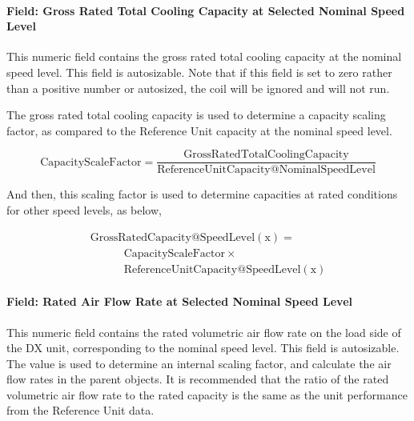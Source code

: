 \paragraph{Field: Gross Rated Total Cooling Capacity at Selected Nominal Speed Level}\label{field-gross-rated-total-cooling-capacity-at-selected-nominal-speed-level}

This numeric field contains the gross rated total cooling capacity at the nominal speed level. This field is autosizable. Note that if this field is set to zero rather than a positive number or autosized, the coil will be ignored and will not run.

The gross rated total cooling capacity is used to determine a capacity scaling factor, as compared to the Reference Unit capacity at the nominal speed level.

\begin{equation}
{\mathrm{CapacityScaleFactor}} = \frac{{{\mathrm{Gross RatedTotalCoolingCapacity}}}}{{{\mathrm{ReferenceUnitCapacity}}@{\mathrm{NominalSpeedLevel}}}}
\end{equation}

And then, this scaling factor is used to determine capacities at rated conditions for other speed levels, as below,

\begin{equation}
  \begin{array}{l}
    \mathrm{Gross RatedCapacity} @ \mathrm{SpeedLevel} \left( {\mathrm{x}} \right) = \\
    \quad \quad \quad \mathrm{CapacityScaleFactor} \times \\
    \quad \quad \quad \mathrm{ReferenceUnitCapacity} @ {\mathrm{SpeedLevel}}(\mathrm{x})
  \end{array}
\end{equation}

\paragraph{Field: Rated Air Flow Rate at Selected Nominal Speed Level}\label{field-rated-air-flow-rate-at-selected-nominal-speed-level}

This numeric field contains the rated volumetric air flow rate on the load side of the DX unit, corresponding to the nominal speed level. This field is autosizable. The value is used to determine an internal scaling factor, and calculate the air flow rates in the parent objects. It is recommended that the ratio of the rated volumetric air flow rate to the rated capacity is the same as the unit performance from the Reference Unit data.

